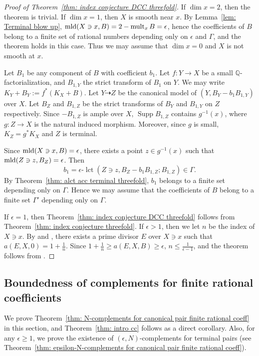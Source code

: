 \documentclass[11pt]{amsart}
\numberwithin{equation}{section}
\newcommand{\Qq}{\mathbb{Q}}
\newcommand{\mld}{{\rm{mld}}}
\newcommand{\lct}{\operatorname{lct}}
\newcommand{\Supp}{\operatorname{Supp}}
\newcommand{\mult}{\operatorname{mult}}
\newcommand{\Ii}{{\Gamma}}
\theoremstyle{definition}
\theoremstyle{definition}
\begin{document}
\begin{proof}[Proof of Theorem~\ref{thm: index conjecture DCC threefold}]
If $\dim x=2$, then the theorem is trivial. If $\dim x=1$, then $X$ is smooth near $x$. By Lemma~\ref{lem: Terminal blow up}, $\mld(X\ni x, B)=2-\mult_{x} B=\epsilon$, hence the coefficients of $B$ belong to a finite set of rational numbers depending only on $\epsilon$ and $\Ii$, and the theorem holds in this case. Thus we may assume that $\dim x=0$ and $X$ is not smooth at $x$.

Let $B_1$ be any component of $B$ with coefficient $b_1$. Let $f:Y\to X$ be a small $\Qq$-factorialization, and $B_{1,Y}$ the strict transform of $B_1$ on $Y$. We may write $K_Y+B_Y:=f^{*}(K_X+B)$. Let $Y\dashrightarrow Z$ be the canonical model of $(Y,B_Y-b_1B_{1,Y})$ over $X$. Let $B_{Z}$ and $B_{1,Z}$ be the strict transforms of $B_Y$ and $B_{1,Y}$ on $Z$ respectively. Since $-B_{1,Z}$ is ample over $X$, $\Supp B_{1,Z}$ contains $g^{-1}(x)$, where $g:Z\to X$ is the natural induced morphism. Moreover, since $g$ is small, $K_Z=g^{*}K_X$ and $Z$ is terminal.

Since $\mld(X\ni x,B)=\epsilon$, there exists a point $z\in g^{-1}(x)$ such that $\mld(Z\ni z,B_Z)=\epsilon$. Then $$b_1=\epsilon\text{-}\lct(Z\ni z,B_Z-b_1B_{1,Z};B_{1,Z})\in \Ii.$$ By Theorem~\ref{thm: alct acc terminal threefold}, $b_1$ belongs to a finite set depending only on $\Ii$. Hence we may assume that the coefficients of $B$ belong to a finite set $\Ii'$ depending only on $\Ii$.

If $\epsilon=1$, then Theorem~\ref{thm: index conjecture DCC threefold} follows from Theorem~\ref{thm: index conjecture threefold}. If $\epsilon>1$, then we let $n$ be the index of $X\ni x$. By \cite[Appendix, Theorem]{Sho92} and \cite[Theorem~0.1]{Mar96}, there exists a prime divisor $E$ over $X\ni x$ such that $a(E,X,0)=1+\frac{1}{n}$. Since $1+\frac{1}{n}\geq a(E,X,B)\geq \epsilon$, $n\leq \frac{1}{\epsilon-1}$, and the theorem follows from \cite[Lemma 5.1]{Kaw88}.
\end{proof}



\subsection{Boundedness of complements for finite rational coefficients}
We prove Theorem~\ref{thm: N-complements for canonical pair finite rational coeff} in this section, and Theorem~\ref{thm: intro cc} follows as a direct corollary. Also, for any $\epsilon\geq 1$, we prove the existence of $(\epsilon,N)$-complements for terminal pairs (see Theorem~\ref{thm: epsilon-N-complements for canonical pair finite rational coeff}).
\end{document}
